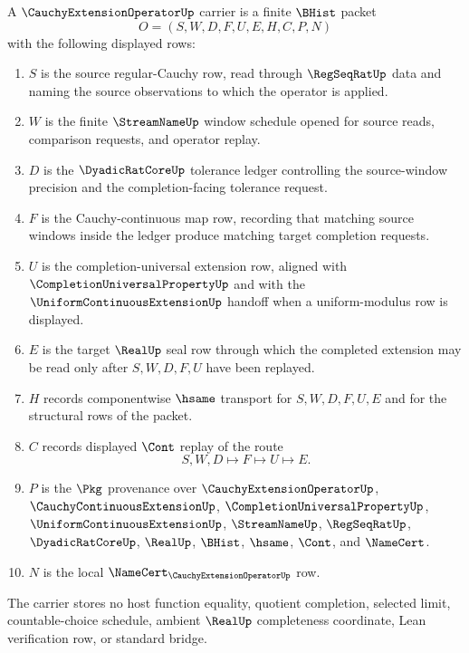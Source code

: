 \begin{definition}
\label{def:cauchy-extension-operator-carrier}
A $\CauchyExtensionOperatorUp$ carrier is a finite $\BHist$ packet
$$
O=(S,W,D,F,U,E,H,C,P,N)
$$
with the following displayed rows:
\begin{enumerate}
\item $S$ is the source regular-Cauchy row, read through $\RegSeqRatUp$ data and naming the source observations to which the operator is applied.
\item $W$ is the finite $\StreamNameUp$ window schedule opened for source reads, comparison requests, and operator replay.
\item $D$ is the $\DyadicRatCoreUp$ tolerance ledger controlling the source-window precision and the completion-facing tolerance request.
\item $F$ is the Cauchy-continuous map row, recording that matching source windows inside the ledger produce matching target completion requests.
\item $U$ is the completion-universal extension row, aligned with $\CompletionUniversalPropertyUp$ and with the $\UniformContinuousExtensionUp$ handoff when a uniform-modulus row is displayed.
\item $E$ is the target $\RealUp$ seal row through which the completed extension may be read only after $S,W,D,F,U$ have been replayed.
\item $H$ records componentwise $\hsame$ transport for $S,W,D,F,U,E$ and for the structural rows of the packet.
\item $C$ records displayed $\Cont$ replay of the route
$$
S,W,D\longmapsto F\longmapsto U\longmapsto E .
$$
\item $P$ is the $\Pkg$ provenance over $\CauchyExtensionOperatorUp$, $\CauchyContinuousExtensionUp$, $\CompletionUniversalPropertyUp$, $\UniformContinuousExtensionUp$, $\StreamNameUp$, $\RegSeqRatUp$, $\DyadicRatCoreUp$, $\RealUp$, $\BHist$, $\hsame$, $\Cont$, and $\NameCert$.
\item $N$ is the local $\NameCert_{\CauchyExtensionOperatorUp}$ row.
\end{enumerate}
The carrier stores no host function equality, quotient completion, selected limit, countable-choice schedule, ambient $\RealUp$ completeness coordinate, Lean verification row, or standard bridge.
\end{definition}


